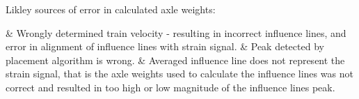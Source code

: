 Likley sources of error in calculated axle weights:
\begin{easylist}[itemize]
	& Wrongly determined train velocity - resulting in incorrect influence lines, and error in alignment of influence lines with strain signal.
	& Peak detected by placement algorithm is wrong.
	& Averaged influence line does not represent the strain signal, that is the axle weights used to calculate the influence lines was not correct and resulted in too high or low magnitude of the influence lines peak.
\end{easylist}
